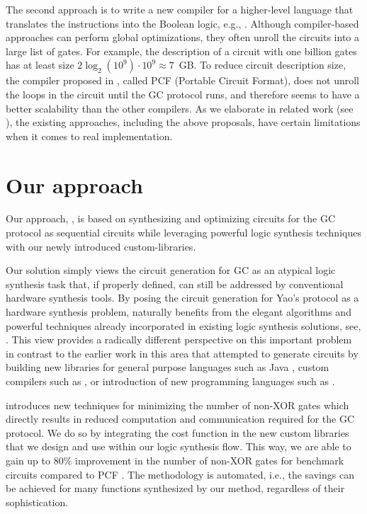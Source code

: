 The second approach is to write a new compiler for a higher-level language that translates the instructions into the Boolean logic, e.g., \cite{malkhi2004fairplay,kreuter2012billion,kreuter2013pcf,franz2014cbmc}.
Although compiler-based approaches can perform global optimizations, they often unroll the circuits into a large list of gates.
For example, the description of a circuit with one billion gates has at least size $2 \log_2 (10^9) \cdot 10^{9} \approx 7$~GB.
To reduce circuit description size, the compiler proposed in \cite{kreuter2013pcf}, called PCF (Portable Circuit Format), does not unroll the loops in the circuit until the GC protocol runs, and therefore seems to have a better scalability than the other compilers.
As we elaborate in related work (see ), the existing approaches, including the above proposals, have certain limitations when it comes to real implementation.

\section{Our approach}\label{sec:into-approach}
Our approach, \sys{}, is based on synthesizing and optimizing circuits for the GC protocol as sequential circuits while leveraging powerful logic synthesis techniques with our newly introduced custom-libraries.

Our solution simply views the circuit generation for GC as an atypical logic synthesis task that, if properly defined, can still be addressed by conventional hardware synthesis tools.
By posing the circuit generation for Yao's protocol as a hardware synthesis problem, \sys{} naturally benefits from the elegant algorithms and powerful techniques already incorporated in existing logic synthesis solutions, see, \cite{Techreport:Sentovich1992,Book:DeMicheli1994,Book:Devadas1994,TCAD:Brayton2006}.
This view provides a radically different perspective on this important problem in contrast to the earlier work in this area that attempted to generate circuits by building new libraries for general purpose languages such as Java \cite{huang2011faster,malka2011vmcrypt}, custom compilers such as \cite{kreuter2013pcf,franz2014cbmc}, or introduction of new programming languages such as \cite{malkhi2004fairplay,rastogi2014wysteria}.

\sys{} introduces new techniques for minimizing the number of non-XOR gates which directly results in reduced computation and communication required for the GC protocol.
We do so by integrating the cost function in the new custom libraries that we design and use within our logic synthesis flow.
This way, we are able to gain up to $80\%$ improvement in the number of non-XOR gates for benchmark circuits compared to PCF \cite{kreuter2013pcf}.
The \sys{} methodology is automated, i.e., the savings can be achieved for many functions synthesized by our method, regardless of their sophistication.

